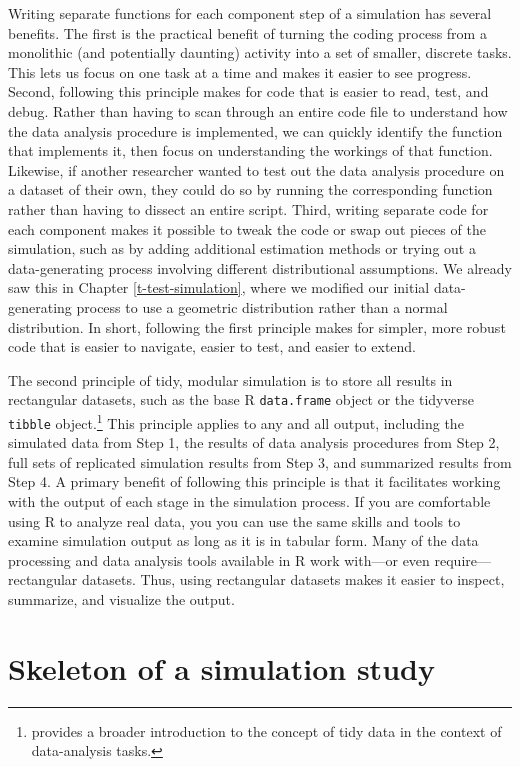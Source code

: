 \documentclass[
]{book}
\begin{document}
Writing separate functions for each component step of a simulation has several benefits.
The first is the practical benefit of turning the coding process from a monolithic (and potentially daunting) activity into a set of smaller, discrete tasks.
This lets us focus on one task at a time and makes it easier to see progress.
Second, following this principle makes for code that is easier to read, test, and debug.
Rather than having to scan through an entire code file to understand how the data analysis procedure is implemented, we can quickly identify the function that implements it, then focus on understanding the workings of that function.
Likewise, if another researcher wanted to test out the data analysis procedure on a dataset of their own, they could do so by running the corresponding function rather than having to dissect an entire script.
Third, writing separate code for each component makes it possible to tweak the code or swap out pieces of the simulation, such as by adding additional estimation methods or trying out a data-generating process involving different distributional assumptions.
We already saw this in Chapter \ref{t-test-simulation}, where we modified our initial data-generating process to use a geometric distribution rather than a normal distribution.
In short, following the first principle makes for simpler, more robust code that is easier to navigate, easier to test, and easier to extend.

The second principle of tidy, modular simulation is to store all results in rectangular datasets, such as the base R \texttt{data.frame} object or the tidyverse \texttt{tibble} object.\footnote{\citet{Wickham2014tidydata} provides a broader introduction to the concept of tidy data in the context of data-analysis tasks.}
This principle applies to any and all output, including the simulated data from Step 1, the results of data analysis procedures from Step 2, full sets of replicated simulation results from Step 3, and summarized results from Step 4.
A primary benefit of following this principle is that it facilitates working with the output of each stage in the simulation process.
If you are comfortable using R to analyze real data, you you can use the same skills and tools to examine simulation output as long as it is in tabular form.
Many of the data processing and data analysis tools available in R work with---or even require---rectangular datasets.
Thus, using rectangular datasets makes it easier to inspect, summarize, and visualize the output.

\section{Skeleton of a simulation study}\label{skeleton-of-a-simulation-study}
\end{document}

